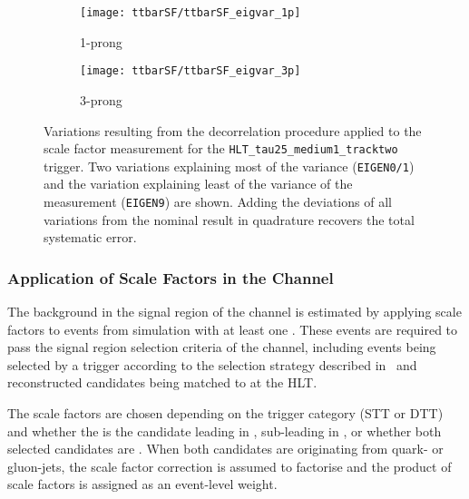 \begin{figure}[htbp]
  \centering

  \begin{subfigure}[t]{.495\textwidth}
    \texttt{[image: ttbarSF/ttbarSF\_eigvar\_1p]}
    \caption{1-prong \tauhadvis}
    \label{fig:ttbarSF_eigenvariations_1p}
  \end{subfigure}\hfill%
  \begin{subfigure}[t]{.495\textwidth}
    \texttt{[image: ttbarSF/ttbarSF\_eigvar\_3p]}
    \caption{3-prong \tauhadvis}
    \label{fig:ttbarSF_eigenvariations_3p}
  \end{subfigure}

  \caption{Variations resulting from the decorrelation procedure
    applied to the \faketauhadvis scale factor measurement for the
    \texttt{HLT\_tau25\_medium1\_tracktwo} trigger. Two variations
    explaining most of the variance (\texttt{EIGEN0/1}) and the
    variation explaining least of the variance of the measurement
    (\texttt{EIGEN9}) are shown. Adding the deviations of all
    variations from the nominal result in quadrature recovers the
    total systematic error.}%
  \label{fig:ttbarSF_eigenvariations}
\end{figure}


\subsubsection{Application of \faketauhadvis Scale Factors in the
  \hadhad Channel}

The \ttbarFakes background in the signal region of the \hadhad channel
is estimated by applying \faketauhadvis scale factors to \ttbar events
from simulation with at least one \faketauhadvis. These events are
required to pass the signal region selection criteria of the \hadhad
channel, including events being selected by a trigger according to the
selection strategy described in~ and reconstructed
\tauhadvis candidates being matched to \tauhadvis at the HLT.

The scale factors are chosen depending on the trigger category (STT or
DTT) and whether the \faketauhadvis is the \tauhadvis candidate
leading in \pT, sub-leading in \pT, or whether both selected
candidates are \faketauhadvis. When both \tauhadvis candidates are
originating from quark- or gluon-jets, the scale factor correction is
assumed to factorise and the product of scale factors is assigned as
an event-level weight.

